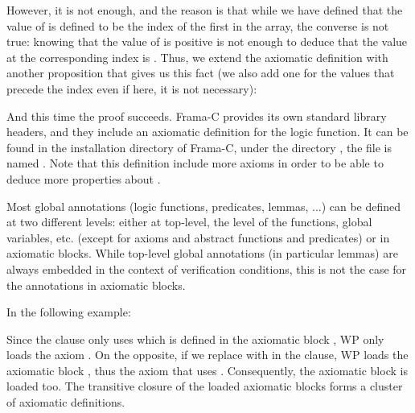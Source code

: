 


However, it is not enough, and the reason is that while we have defined
that the value of  is defined to be the index of
the first  in the array, the converse is
not true: knowing that the value of  is positive
is not enough to deduce that the value at the corresponding index is
. Thus, we extend the axiomatic definition
with another proposition that gives us this fact (we also add one for the
values that precede the  index even if here, it is
not necessary):







And this time the proof succeeds. Frama-C provides its own standard
library headers, and they include an
axiomatic definition for the  logic function. It can
be found in the installation directory of Frama-C, under the directory
, the file is named .
Note that this definition include more axioms in order to be able to
deduce more properties about .




Most global annotations (logic functions, predicates, lemmas, ...) can be
defined at two different levels: either at top-level, the level of the
functions, global variables, etc. (except for axioms and abstract functions and
predicates) or in axiomatic blocks. While top-level global annotations (in
particular lemmas) are always embedded in the context of verification
conditions, this is not the case for the annotations in axiomatic blocks.


In the following example:




Since the  clause only uses  which is defined
in the axiomatic block , WP only loads the axiom .
On the opposite, if we replace  with  in the
 clause, WP loads the axiomatic block , thus
the axiom  that uses . Consequently, the axiomatic
block  is loaded too. The transitive closure of the loaded
axiomatic blocks forms a cluster of axiomatic definitions.


